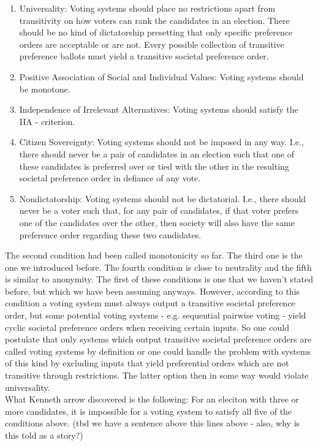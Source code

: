 \begin{enumerate} 
\item Universality: Voting systems should place no restrictions apart from transitivity on how voters can rank the candidates in an election. There should be no kind of dictatorship presetting that only specific preference orders are acceptable or are not. Every possible collection of transitive preference ballots must yield a transitive societal preference order. 
\item Positive Association of Social and Individual Values: Voting systems should be monotone. 
\item Independence of Irrelevant Alternatives: Voting systems should satisfy the IIA - criterion. 
\item Citizen Sovereignty: Voting systems should not be imposed in any way. I.e., there should never be a pair of candidates in an election such that one of these candidates is preferred over or tied with the other in the resulting societal preference order in defiance of any vote. 
\item Nondictatorship: Voting systems should not be dictatorial. I.e., there should never be a voter such that, for any pair of candidates, if that voter prefers one of the candidates over the other, then society will also have the same preference order regarding these two candidates. 
\end{enumerate} 
The second condition had been called monotonicity so far. The third one is the one we introduced before. The fourth condition is close to neutrality and the fifth is similar to anonymity. 
The first of these conditions is one that we haven't stated before, but which we have been assuming anyways. However, according to this condition a voting system must always output a transitive societal preference order, but some potential voting systems - e.g. sequential pairwise voting - yield cyclic societal preference orders when receiving certain inputs. So one could postulate that only systems which output transitive societal preference orders are called voting systems by definition or one could handle the problem with systems of this kind by excluding inputs that yield preferential orders which are not transitive through restrictions. The latter option then in some way would violate universality. \\
What Kenneth arrow discovered is the following: For an eleciton with three or more candidates, it is impossible for a voting system to satisfy all five of the conditions above. (tbd we have a sentence above this lines above - also, why is this told as a story?) \\
